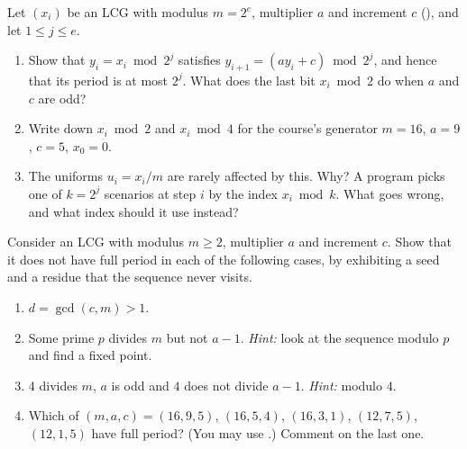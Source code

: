 
\begin{exercise}\label{ex:rng-low-bits}
\easy Let $(x_i)$ be an LCG with modulus $m=2^e$, multiplier $a$ and increment $c$
(), and let $1\le j\le e$.
\begin{enumerate}[label=(\alph*)]
  \item Show that $y_i=x_i\bmod2^j$ satisfies $y_{i+1}=(ay_i+c)\bmod2^j$, and hence that its
    period is at most $2^j$. What does the last bit $x_i\bmod2$ do when $a$ and $c$ are odd?
  \item Write down $x_i\bmod2$ and $x_i\bmod4$ for the course's generator $m=16$, $a=9$,
    $c=5$, $x_0=0$.
  \item The uniforms $u_i=x_i/m$ are rarely affected by this. Why? A program picks one of
    $k=2^j$ scenarios at step $i$ by the index $x_i\bmod k$. What goes wrong, and what index
    should it use instead?
\end{enumerate}
\end{exercise}

\begin{exercise}\label{ex:rng-hull-dobell}
\medium Consider an LCG with modulus $m\ge2$, multiplier $a$ and increment $c$. Show that
it does not have full period in each of the following cases, by exhibiting a seed and a
residue that the sequence never visits.
\begin{enumerate}[label=(\alph*)]
  \item $d=\gcd(c,m)>1$.
  \item Some prime $p$ divides $m$ but not $a-1$. \emph{Hint:} look at the sequence modulo
    $p$ and find a fixed point.
  \item $4$ divides $m$, $a$ is odd and $4$ does not divide $a-1$. \emph{Hint:} modulo $4$.
  \item Which of $(m,a,c)=(16,9,5)$, $(16,5,4)$, $(16,3,1)$, $(12,7,5)$, $(12,1,5)$ have
    full period? (You may use .) Comment on the last one.
\end{enumerate}
\end{exercise}

